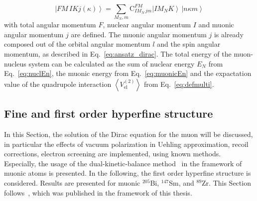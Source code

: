 \begin{equation}
\label{eq:totalState}
\left| FM\,IKj(\kappa)\right> = \sum_{M_N, m}\text{C}^{FM}_{IM_N\,jm}\left|IM_NK\right>\,\left|n\kappa m\right>
\end{equation}
with total angular momentum $F$, nuclear angular momentum $I$ and muonic angular momentum $j$ are defined. The muonic angular momentum $j$ is already composed out of the orbital angular momentum $l$ and the spin angular momentum, as described in Eq.~\eqref{eq:ansatz_dirac}. The total energy of the muon-nucleus system can be calculated as the sum of nuclear energy $E_N$ from Eq.~\eqref{eq:nuclEn}, the muonic energy from Eq.~\eqref{eq:muonicEn} and the expactation value of the quadrupole interaction $\left<V_{\text{el}}^{(2)}\right>$ from Eq.~\eqref{eq:defmulti}.

\subsection{Fine and first order hyperfine structure}
\label{sec:muon_finestructure}
In this Section, the solution of the Dirac equation for the muon will be discussed, in particular the effects of vacuum polarization in Uehling approximation, recoil corrections, electron screening are implemented, using known methods. Especially, the usage of the dual-kinetic-balance method~\cite{Shabaev2004} in the framework of muonic atoms is presented. In the following, the first order hyperfine structure is considered. Results are presented for muonic $^{205}$Bi, $^{147}$Sm, and $^{89}$Zr. This Section follows~\cite{michel2017}, which was published in the framework of this thesis.

